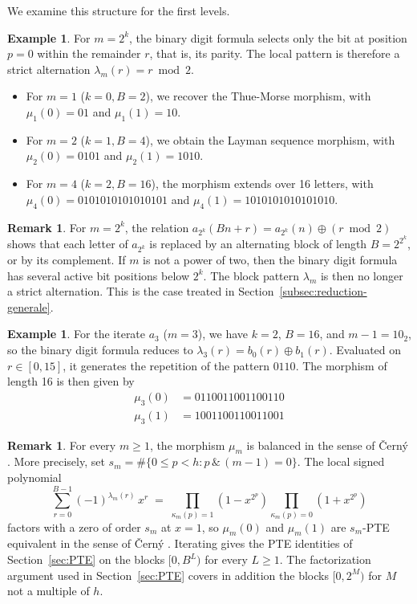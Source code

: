 \documentclass[12pt,reqno]{article}
\theoremstyle{plain}
\theoremstyle{definition}
\newtheorem{example}[theorem]{Example}
\newtheorem{remark}[theorem]{Remark}
\begin{document}
We examine this structure for the first levels.

\begin{example}
For $m = 2^k$, the binary digit formula selects only the bit at position $p=0$ within the remainder $r$, that is, its parity. The local pattern is therefore a strict alternation $\lambda_m(r) = r \bmod 2$.
\begin{itemize}
    \item For $m=1$ ($k=0, B=2$), we recover the Thue-Morse morphism, with $\mu_1(0) = 01$ and $\mu_1(1) = 10$.
    \item For $m=2$ ($k=1, B=4$), we obtain the Layman sequence morphism, with $\mu_2(0) = 0101$ and $\mu_2(1) = 1010$.
    \item For $m=4$ ($k=2, B=16$), the morphism extends over 16 letters, with $\mu_4(0) = 0101010101010101$ and $\mu_4(1) = 1010101010101010$.
\end{itemize}
\end{example}

\begin{remark}
For $m = 2^k$, the relation $a_{2^k}(Bn+r) = a_{2^k}(n) \oplus (r \bmod 2)$ shows that each letter of $a_{2^k}$ is replaced by an alternating block of length $B = 2^{2^k}$, or by its complement. If $m$ is not a power of two, then the binary digit formula has several active bit positions below $2^k$. The block pattern $\lambda_m$ is then no longer a strict alternation. This is the case treated in Section~\ref{subsec:reduction-generale}.
\end{remark}

\begin{example}
For the iterate $a_3$ ($m=3$), we have $k=2$, $B=16$, and $m-1 = 10_2$,
so the binary digit formula reduces to $\lambda_3(r) = b_0(r) \oplus
b_1(r)$. Evaluated on $r \in [0, 15]$, it generates the repetition of
the pattern $0110$. The morphism of length 16 is then given by
\begin{align*}
  \mu_3(0) &= 0110011001100110 \\
  \mu_3(1) &= 1001100110011001
\end{align*}
\end{example}

\begin{remark}
For every $m \ge 1$, the morphism $\mu_m$ is balanced in the sense of \v{C}ern\'y \cite{Cerny2013, Cerny2017}. More precisely, set $s_m = \#\{0 \le p < h : p\,\&\,(m-1) = 0\}$. The local signed polynomial
\[
\sum_{r=0}^{B-1} (-1)^{\lambda_m(r)}\, x^r \;=\; \prod_{\kappa_m(p) = 1} (1 - x^{2^p}) \prod_{\kappa_m(p) = 0} (1 + x^{2^p})
\]
factors with a zero of order $s_m$ at $x = 1$, so $\mu_m(0)$ and $\mu_m(1)$ are $s_m$-PTE equivalent in the sense of \v{C}ern\'y \cite{Cerny2013}. Iterating gives the PTE identities of Section~\ref{sec:PTE} on the blocks $[0, B^L)$ for every $L \ge 1$. The factorization argument used in Section~\ref{sec:PTE} covers in addition the blocks $[0, 2^M)$ for $M$ not a multiple of $h$.
\end{remark}
\end{document}

